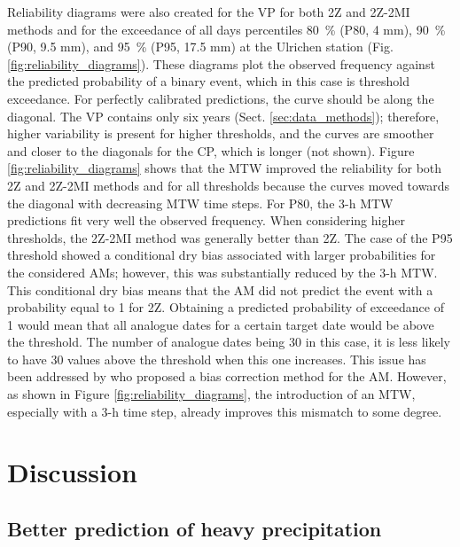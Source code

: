 \documentclass[hess, manuscript]{copernicus}
\begin{document}
	Reliability diagrams were also created for the VP for both 2Z and 2Z-2MI methods and for the exceedance of all days percentiles 80~\% (P80, 4 mm), 90~\% (P90, 9.5 mm), and 95~\% (P95, 17.5 mm) at the Ulrichen station (Fig. \ref{fig:reliability_diagrams}). These diagrams plot the observed frequency against the predicted probability of a binary event, which in this case is threshold exceedance. For perfectly calibrated predictions, the curve should be along the diagonal. The VP contains only six years (Sect. \ref{sec:data_methods}); therefore, higher variability is present for higher thresholds, and the curves are smoother and closer to the diagonals for the CP, which is longer (not shown). Figure \ref{fig:reliability_diagrams} shows that the MTW improved the reliability for both 2Z and 2Z-2MI methods and for all thresholds because the curves moved towards the diagonal with decreasing MTW time steps. For P80, the 3-h MTW predictions fit very well the observed frequency. When considering higher thresholds, the 2Z-2MI method was generally better than 2Z. The case of the P95 threshold showed a conditional dry bias associated with larger probabilities for the considered AMs; however, this was substantially reduced by the 3-h MTW. This conditional dry bias means that the AM did not predict the event with a probability equal to 1 for 2Z. Obtaining a predicted probability of exceedance of 1 would mean that all analogue dates for a certain target date would be above the threshold. The number of analogue dates being 30 in this case, it is less likely to have 30 values above the threshold when this one increases. This issue has been addressed by \cite{Marty2010} who proposed a bias correction method for the AM. However, as shown in Figure \ref{fig:reliability_diagrams}, the introduction of an MTW, especially with a 3-h time step, already improves this mismatch to some degree.
	
	
	\section{Discussion}
	\label{sec:discussion}
	
	\subsection{Better prediction of heavy precipitation}
	
\end{document}
